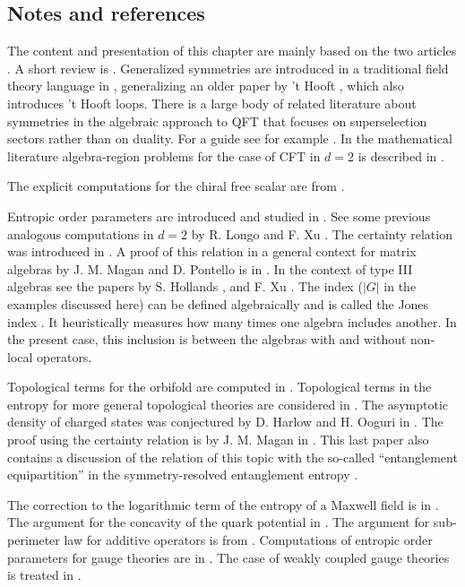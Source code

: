 \documentclass[12pt]{article}
\numberwithin{equation}{section}
\begin{document}
\subsection{Notes and references}
The content and presentation of this chapter are mainly based on the two articles \cite{casini2020entanglement,Casini:2020rgj}. A short review is \cite{Casini:2021zgr}. Generalized symmetries are introduced in a traditional field theory language in \cite{aharony2013reading}, generalizing an older paper by 't Hooft \cite{tHooft:1977nqb}, which also introduces 't Hooft loops.  There is a large body of related literature about symmetries in the algebraic approach to QFT that focuses on superselection sectors rather than on duality. For a guide see for example \cite{Haag:1992hx}. In the mathematical literature algebra-region problems for the case of CFT in $d=2$ is described in \cite{brunetti1993modular}.

The explicit computations for the chiral free scalar are from \cite{Arias:2018tmw}.

Entropic order parameters are introduced and studied in \cite{casini2020entanglement,Casini:2020rgj}. See some previous analogous computations in $d=2$ by R. Longo and F. Xu \cite{Longo:2017mbg}.  The certainty relation was introduced in \cite{casini2020entanglement}. A proof of this relation in a  general context for matrix algebras by J. M. Magan and D. Pontello is in \cite{magan2021quantum}. In the context of type III algebras see the papers by S. Hollands \cite{hollands2020variational}, and F. Xu \cite{xu2020relative}. The index ($|G|$ in the examples discussed here) can be defined algebraically and is called the Jones index \cite{Jones1983,KOSAKI1986123,cmp/1104179850}. It heuristically measures how many times one algebra includes another. In the present case, this inclusion is between the algebras with and without non-local operators.
    
 Topological terms for the orbifold are computed in \cite{casini2020entanglement}. Topological terms in the entropy for more general topological theories are considered in \cite{Kitaev:2005dm,Levin:2006zz}.  The asymptotic density of charged states was conjectured by D. Harlow and H. Ooguri in \cite{Harlow:2021trr}. The proof using the certainty relation is by J. M. Magan in \cite{Magan:2021myk}. This last paper also contains a discussion of the relation of this topic with the so-called ``entanglement equipartition'' in the symmetry-resolved entanglement entropy \cite{PhysRevB.98.041106,Murciano:2020vgh}. 
 
 The correction to the logarithmic term of the entropy of a Maxwell field is in \cite{casini2020logarithmic}. The argument for the concavity of the quark potential in \cite{bachas1986concavity}. The argument for sub-perimeter law for additive operators is from \cite{Casini:2020rgj}. 
Computations of entropic order parameters for gauge theories are in \cite{Casini:2020rgj}. The case of weakly coupled gauge theories is treated in \cite{Casini:2021tax}.
\newpage



{}

\end{document}
